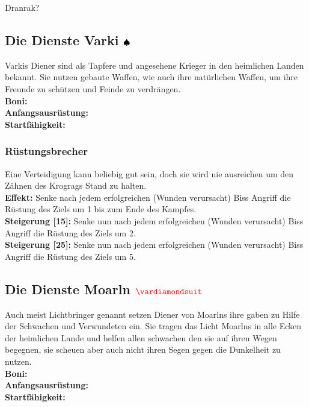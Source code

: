 Dranrak?


\subsection*{Die Dienste Varki ${\color{blue} }{\color{black}\spadesuit}$}
Varkis Diener sind als Tapfere und angesehene Krieger in den heimlichen Landen bekannt. Sie nutzen gebaute Waffen, wie auch ihre natürlichen Waffen, um ihre Freunde zu schützen und Feinde zu verdrängen.\\
\textbf{Boni:} \\
\textbf{Anfangsausrüstung:} \\
\textbf{Startfähigkeit:}  \\

\subsubsection*{Rüstungsbrecher} \label{sk:ruestungsbrecher}
Eine Verteidigung kann beliebig gut sein, doch sie wird nie ausreichen um den Zähnen des Krogrags Stand zu halten.\\
\textbf{Effekt:} Senke nach jedem erfolgreichen (Wunden verursacht) Biss Angriff die Rüstung des Ziels um 1 bis zum Ende des Kampfes.\\
\textbf{Steigerung [15]:} Senke nun nach jedem erfolgreichen (Wunden verursacht) Biss Angriff die Rüstung des Ziels um 2. \\
\textbf{Steigerung [25]:} Senke nun nach jedem erfolgreichen (Wunden verursacht) Biss Angriff die Rüstung des Ziels um 5.


\subsection*{Die Dienste Moarln $\Karo{}$}
Auch meist Lichtbringer genannt setzen Diener von Moarlns ihre gaben zu Hilfe der Schwachen und Verwundeten ein. Sie tragen das Licht Moarlns in alle Ecken der heimlichen Lande und helfen allen schwachen den sie auf ihren Wegen begegnen, sie scheuen aber auch nicht ihren Segen gegen die Dunkelheit zu nutzen.\\
\textbf{Boni:} \\
\textbf{Anfangsausrüstung:} \\
\textbf{Startfähigkeit:} 


